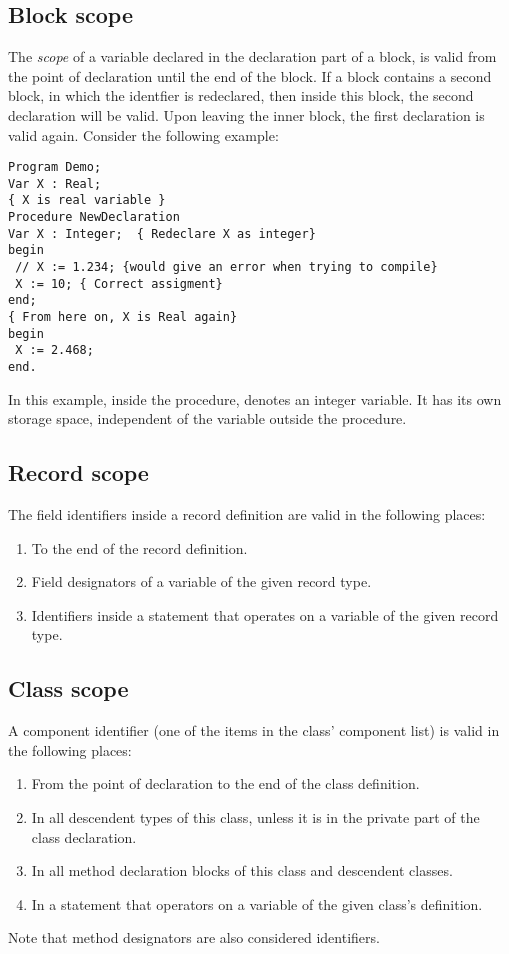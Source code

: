 \subsection{Block scope}
The {\em scope} of a variable declared in the declaration part of a block,
is valid from the point of declaration until the end of the block.
If a block contains a second block, in which the identfier is
redeclared, then inside this block, the second declaration will be valid.
Upon leaving the inner block, the first declaration is valid again.
Consider the following example:
\begin{verbatim}
Program Demo;
Var X : Real;
{ X is real variable }
Procedure NewDeclaration
Var X : Integer;  { Redeclare X as integer}
begin
 // X := 1.234; {would give an error when trying to compile}
 X := 10; { Correct assigment}
end;
{ From here on, X is Real again}
begin
 X := 2.468;
end.
\end{verbatim}
In this example, inside the procedure,  denotes an integer variable.
It has its own storage space, independent of the variable  outside
the procedure.

\subsection{Record scope}
The field identifiers inside a record definition are valid in the following
places:
\begin{enumerate}
\item To the end of the record definition.
\item Field designators of a variable of the given record type.
\item Identifiers inside a  statement that operates on a variable
of the given record type.
\end{enumerate}

\subsection{Class scope}
A component identifier (one of the items in the class' component list) 
is valid in the following places:
\begin{enumerate}
\item From the point of declaration to the end of the class definition.
\item In all descendent types of this class, unless it is in the private
part of the class declaration.
\item In all method declaration blocks of this class and descendent classes.
\item In a  statement that operators on a variable of the given class's
definition.
\end{enumerate}
Note that method designators are also considered identifiers.
